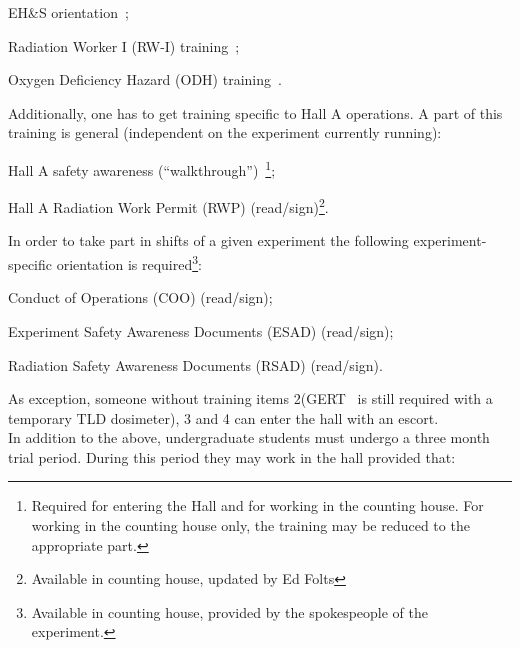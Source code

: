  \begin{list}{.~}{\setlength{\itemsep}{-0.2cm}}    
    \item EH\&S orientation~\cite{EHScebaf};
    \item Radiation Worker I (RW-I) training~\cite{RWIcebaf};
    \item Oxygen Deficiency Hazard (ODH) training~\cite{ODHcebaf}.
    \setcounter{enumtmp1}{\value{enumtmp}}
 \end{list}
\noindent{}Additionally, one has to get training specific to
 Hall A operations. A part of this training is general
(independent on the experiment currently running):
 \begin{list}{.~}{\setlength{\itemsep}{-0.2cm}}    
    \setcounter{enumtmp}{\value{enumtmp1}}
    \item Hall A safety awareness (``walkthrough'')~\cite{SAThalla}\footnote{Required
          for entering the Hall and for working in the counting house.
         For working in the counting house only, the training may be reduced
        to the appropriate part.};
    \item Hall A Radiation Work Permit (RWP) (read/sign)\footnote{Available in counting house,
          updated by Ed Folts}.
    \setcounter{enumtmp1}{\value{enumtmp}}
 \end{list}
\noindent{}In order to take part in shifts of a given experiment the following
  experiment-specific orientation is required\footnote{Available in counting house, 
   provided by the spokespeople of the experiment.}:
 \begin{list}{.~}{\setlength{\itemsep}{-0.2cm}}    
    \setcounter{enumtmp}{\value{enumtmp1}}
    \item Conduct of Operations (COO) (read/sign);
    \item Experiment Safety Awareness Documents (ESAD) (read/sign);
    \item Radiation Safety Awareness Documents (RSAD) (read/sign).
 \end{list}
 
As exception, someone without training items 2(GERT~\cite{RWIcebaf} is still required
with a temporary TLD dosimeter),
3 and 4 can enter the hall with an escort. \\

 In addition to the above, undergraduate students must undergo a three
 month trial period. During this period they may work in the hall
 provided that:

